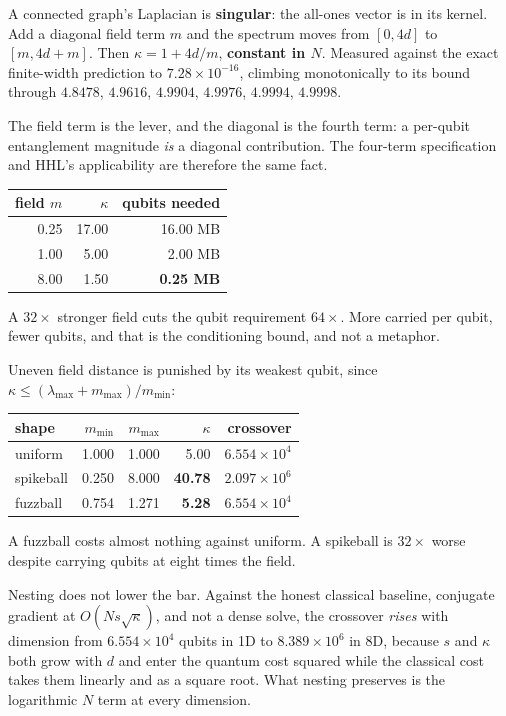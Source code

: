 A connected graph's Laplacian is \textbf{singular}: the all-ones vector is in its kernel. Add a
diagonal field term \(m\) and the spectrum moves from \([0, 4d]\) to \([m, 4d+m]\). Then
\(\kappa = 1 + 4d/m\), \textbf{constant in \(N\)}. Measured against the exact finite-width prediction
to \(7.28 \times 10^{-16}\), climbing monotonically to its bound through \(4.8478\), \(4.9616\),
\(4.9904\), \(4.9976\), \(4.9994\), \(4.9998\).

The field term is the lever, and the diagonal is the fourth term: a per-qubit entanglement magnitude
\emph{is} a diagonal contribution. The four-term specification and HHL's applicability are therefore the
same fact.

\begin{center}
\begin{tabular}{rrr}
\toprule
field \(m\) & \(\kappa\) & qubits needed \\
\midrule
0.25 & 17.00 & 16.00 MB \\
1.00 & 5.00 & 2.00 MB \\
8.00 & 1.50 & \textbf{0.25 MB} \\
\bottomrule
\end{tabular}
\end{center}

A \(32\times\) stronger field cuts the qubit requirement \(64\times\). More carried per qubit, fewer
qubits, and that is the conditioning bound, and not a metaphor.

Uneven field distance is punished by its weakest qubit, since
\(\kappa \le (\lambda_{\max} + m_{\max})/m_{\min}\):

\begin{center}
\begin{tabular}{lrrrr}
\toprule
shape & \(m_{\min}\) & \(m_{\max}\) & \(\kappa\) & crossover \\
\midrule
uniform & 1.000 & 1.000 & 5.00 & \(6.554 \times 10^{4}\) \\
spikeball & 0.250 & 8.000 & \textbf{40.78} & \(2.097 \times 10^{6}\) \\
fuzzball & 0.754 & 1.271 & \textbf{5.28} & \(6.554 \times 10^{4}\) \\
\bottomrule
\end{tabular}
\end{center}

A fuzzball costs almost nothing against uniform. A spikeball is \(32\times\) worse despite
carrying qubits at eight times the field.

Nesting does not lower the bar. Against the honest classical baseline, conjugate gradient at
\(O(N s \sqrt{\kappa})\), and not a dense solve, the crossover \emph{rises} with dimension from
\(6.554 \times 10^{4}\) qubits in 1D to \(8.389 \times 10^{6}\) in 8D, because \(s\) and \(\kappa\)
both grow with \(d\) and enter the quantum cost squared while the classical cost takes them linearly
and as a square root. What nesting preserves is the logarithmic \(N\) term at every dimension.

